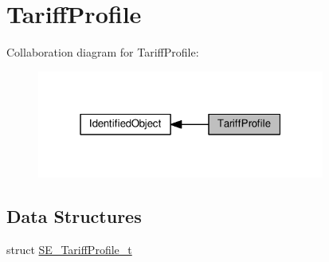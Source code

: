 \hypertarget{group__TariffProfile}{}\section{Tariff\+Profile}
\label{group__TariffProfile}
Collaboration diagram for Tariff\+Profile\+:\nopagebreak
\begin{figure}[H]
\begin{center}
\leavevmode
\includegraphics[width=268pt]{group__TariffProfile}
\end{center}
\end{figure}
\subsection*{Data Structures}
\begin{DoxyCompactItemize}
\item 
struct \hyperlink{structSE__TariffProfile__t}{S\+E\+\_\+\+Tariff\+Profile\+\_\+t}
\end{DoxyCompactItemize}
